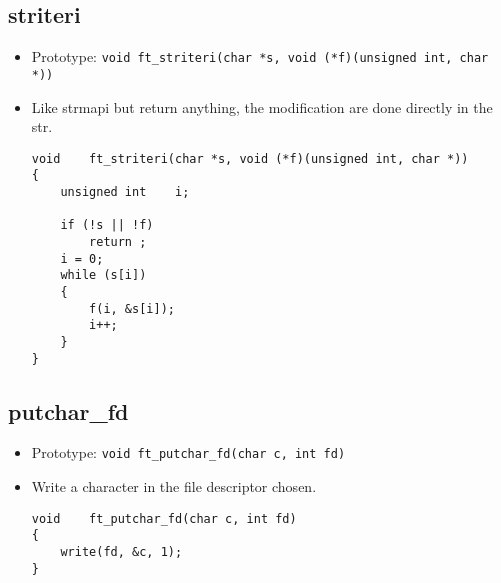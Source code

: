 \documentclass{article}
\begin{document}
	\subsection{striteri}
		\begin{itemize}[label=$\rightarrow$]
			\item Prototype: \texttt{void    ft\_striteri(char *s, void (*f)(unsigned int, char *))                   
}
			\item Like strmapi but return anything, the modification are done directly in the str.
			\begin{verbatim}
void    ft_striteri(char *s, void (*f)(unsigned int, char *))                   
{                                                                               
    unsigned int    i;                                                          
                                                                                
    if (!s || !f)                                                               
        return ;                                                                
    i = 0;                                                                      
    while (s[i])                                                                
    {                                                                           
        f(i, &s[i]);                                                            
        i++;                                                                    
    }                                                                           
} 
			\end{verbatim}
		\end{itemize}
	
	\subsection{putchar\_fd}
		\begin{itemize}[label=$\rightarrow$]
			\item Prototype: \texttt{void    ft\_putchar\_fd(char c, int fd)                                           }
			\item Write a character in the file descriptor chosen.
			\begin{verbatim}
void    ft_putchar_fd(char c, int fd)                                           
{                                                                               
    write(fd, &c, 1);                                                           
}
			\end{verbatim}
		\end{itemize}
	
\end{document}

